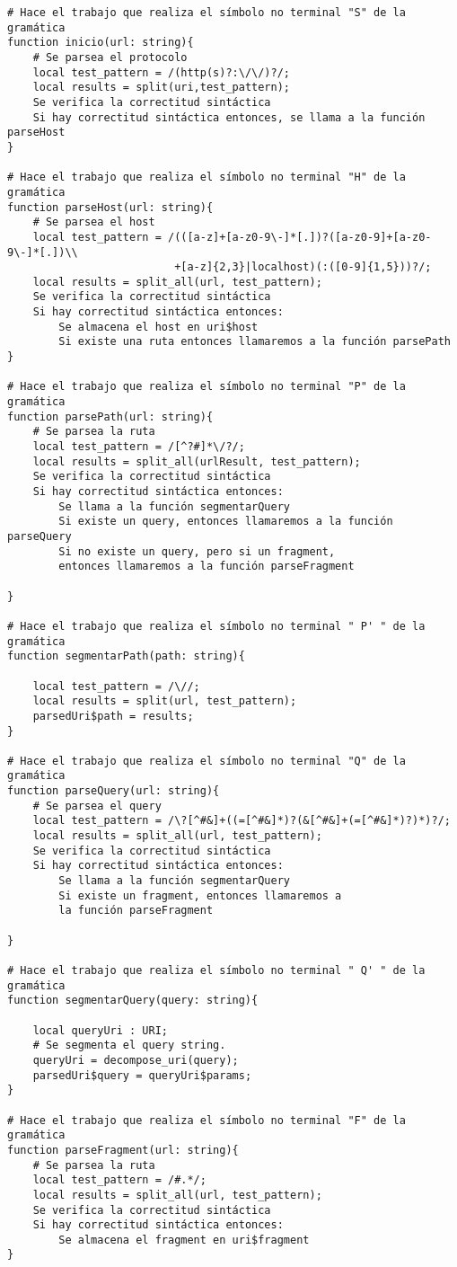 \begin{verbatim}
# Hace el trabajo que realiza el símbolo no terminal "S" de la gramática
function inicio(url: string){
    # Se parsea el protocolo
    local test_pattern = /(http(s)?:\/\/)?/;
    local results = split(uri,test_pattern);
    Se verifica la correctitud sintáctica
    Si hay correctitud sintáctica entonces, se llama a la función parseHost
}

# Hace el trabajo que realiza el símbolo no terminal "H" de la gramática
function parseHost(url: string){
    # Se parsea el host
    local test_pattern = /(([a-z]+[a-z0-9\-]*[.])?([a-z0-9]+[a-z0-9\-]*[.])\\
                          +[a-z]{2,3}|localhost)(:([0-9]{1,5}))?/;
    local results = split_all(url, test_pattern);
    Se verifica la correctitud sintáctica
    Si hay correctitud sintáctica entonces:
        Se almacena el host en uri$host
        Si existe una ruta entonces llamaremos a la función parsePath
}

# Hace el trabajo que realiza el símbolo no terminal "P" de la gramática
function parsePath(url: string){
    # Se parsea la ruta
    local test_pattern = /[^?#]*\/?/;
    local results = split_all(urlResult, test_pattern);
    Se verifica la correctitud sintáctica
    Si hay correctitud sintáctica entonces:
        Se llama a la función segmentarQuery
        Si existe un query, entonces llamaremos a la función parseQuery
        Si no existe un query, pero si un fragment, 
        entonces llamaremos a la función parseFragment

}

# Hace el trabajo que realiza el símbolo no terminal " P' " de la gramática
function segmentarPath(path: string){

    local test_pattern = /\//;
    local results = split(url, test_pattern);
    parsedUri$path = results;
}

# Hace el trabajo que realiza el símbolo no terminal "Q" de la gramática
function parseQuery(url: string){
    # Se parsea el query
    local test_pattern = /\?[^#&]+((=[^#&]*)?(&[^#&]+(=[^#&]*)?)*)?/;
    local results = split_all(url, test_pattern);
    Se verifica la correctitud sintáctica
    Si hay correctitud sintáctica entonces:
        Se llama a la función segmentarQuery
        Si existe un fragment, entonces llamaremos a 
        la función parseFragment

}

# Hace el trabajo que realiza el símbolo no terminal " Q' " de la gramática
function segmentarQuery(query: string){

    local queryUri : URI;
    # Se segmenta el query string.
    queryUri = decompose_uri(query);
    parsedUri$query = queryUri$params;
}

# Hace el trabajo que realiza el símbolo no terminal "F" de la gramática
function parseFragment(url: string){
    # Se parsea la ruta
    local test_pattern = /#.*/;
    local results = split_all(url, test_pattern);
    Se verifica la correctitud sintáctica
    Si hay correctitud sintáctica entonces:
        Se almacena el fragment en uri$fragment
}
\end{verbatim}

